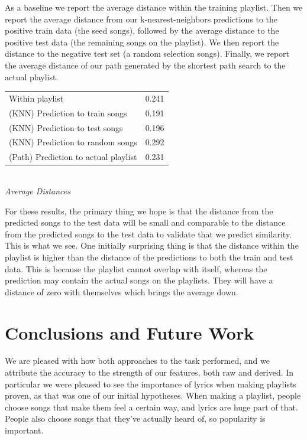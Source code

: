 \documentclass[acmtog]{acmart}
\begin{document}
As a baseline we report the average distance within the training playlist. Then we report the average distance from our k-nearest-neighbors predictions to the positive train data (the seed songs), followed by the average distance to the positive test data (the remaining songs on the playlist). We then report the distance to the negative test set (a random selection songs). Finally, we report the average distance of our path generated by the shortest path search to the actual playlist. \\

\begin{center}
\begin{tabular}{ll}
  \toprule
  Within playlist                      & 0.241 \\
  (KNN) Prediction to train songs      & 0.191 \\
  (KNN) Prediction to test songs       & 0.196 \\
  (KNN) Prediction to random songs     & 0.292 \\
  (Path) Prediction to actual playlist & 0.231 \\
  \bottomrule
\end{tabular}
\\
\footnotesize
  \emph{Average Distances}
\end{center}

For these results, the primary thing we hope is that the distance from the predicted songs to the test data will be small and comparable to the distance from the predicted songs to the test data to validate that we predict similarity. This is what we see. One initially surprising thing is that the distance within the playlist is higher than the distance of the predictions to both the train and test data. This is because the playlist cannot overlap with itself, whereas the prediction may contain the actual songs on the playlists. They will have a distance of zero with themselves which brings the average down.

\section{Conclusions and Future Work}

We are pleased with how both approaches to the task performed, and we attribute the accuracy to the strength of our features, both raw and derived. In particular we were pleased to see the importance of lyrics when making playlists proven, as that was one of our initial hypotheses. When making a playlist, people choose songs that make them feel a certain way, and lyrics are huge part of that. People also choose songs that they've actually heard of, so popularity is important.
\end{document}
